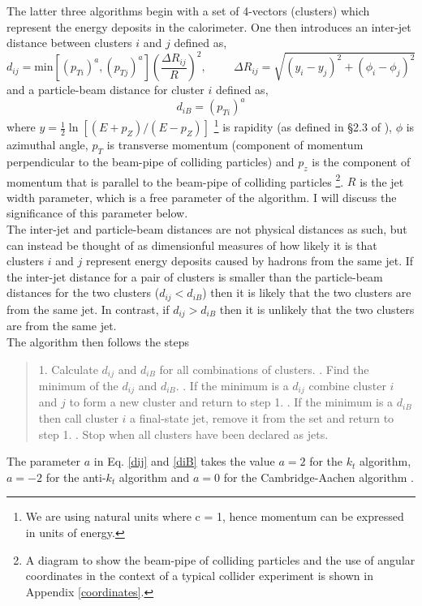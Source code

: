\documentclass[a4paper,11pt, onecolumn]{article}
\begin{document}
 The latter three algorithms begin with a set of 4-vectors (clusters) which represent the energy deposits in the calorimeter. One then introduces an inter-jet distance between
 clusters $i$ and $j$ defined as,
 \begin{equation}
   d_{ij} = \text{min}
[(p_{ Ti})^a, (p_{ Tj})^a]  \left(\frac{\Delta  R_{ij}}{R}\right) ^2, \hspace{1cm} \Delta R_{ij} = \sqrt{(y_{i} - y_{j})^2 + (\phi_{i} - \phi_{j})^2} \label{dij}
 \end{equation}
 \noindent and a particle-beam distance for cluster $i$ defined as,
 \begin{equation}
   d_{iB} = (p_{Ti})^a \label{diB}
 \end{equation}
 where $y = \frac{1}{2}\ln[(E+p_Z)/(E-p_Z)]$ \footnote{We are using natural units where c = 1, hence momentum can be expressed in units of energy.}
 is rapidity (as defined in \S2.3 of \cite{wong}), $\phi$ is azimuthal angle, $p_T$ is transverse momentum (component of momentum perpendicular to the beam-pipe
 of colliding particles) and $p_z$ is the component of momentum that is parallel to the beam-pipe of colliding particles
 \footnote{A diagram to show the beam-pipe of colliding particles and the use of angular coordinates in the context of a typical collider experiment is shown in Appendix \ref{coordinates}.}.
 $R$ is the jet width parameter, which is a free parameter of the algorithm. I will discuss the significance of this parameter below. \\

 The inter-jet and particle-beam distances are not physical distances as such, but can instead be thought of as dimensionful measures of how likely it is that
 clusters $i$ and $j$ represent energy deposits caused by hadrons from the same jet. If the inter-jet distance for a pair of clusters is smaller than the particle-beam distances
 for the two clusters ($d_{ij} < d_{iB}$) 
 then it is likely that the two clusters are from the same jet. 
 In contrast, if $d_{ij} > d_{iB}$ then it is unlikely that the two clusters are from the same jet.\\
 
 \noindent The algorithm then follows the steps
   \begin{quote}
   1. Calculate $d_{ij}$ and $d_{iB}$ for all combinations of clusters. . Find the minimum of the $d_{ij}$ and $d_{iB}$. . If the minimum is a $d_{ij}$ combine cluster $i$ and $j$ to form a new cluster and return to step 1. . If the minimum is a $d_{iB}$ then call cluster $i$ a final-state jet, remove it from the set and return to step 1.  . Stop when all clusters have been declared as jets. 
   \end{quote} 
 The parameter $a$ in Eq. \eqref{dij} and \eqref{diB} takes the value $a = 2$ for the $k_t$ algorithm, $a = -2$ for the anti-$k_t$ algorithm 
 and  $a = 0$ for the Cambridge-Aachen algorithm \cite{salam}. \newline
\end{document}
